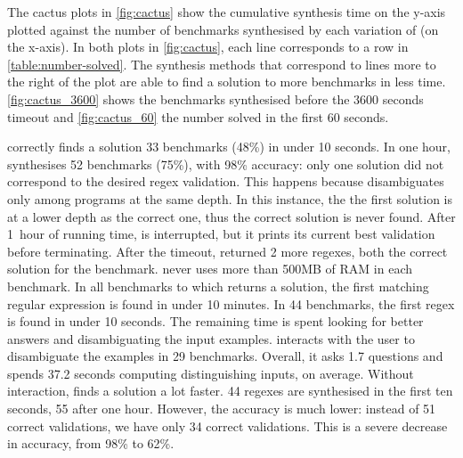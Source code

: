 

The cactus plots in \autoref{fig:cactus} show the cumulative synthesis time on the y-axis plotted against the number of benchmarks synthesised by each variation of \Forest{} (on the x-axis).
%
In both plots in \autoref{fig:cactus}, each line corresponds to a row in \autoref{table:number-solved}.
%
The synthesis methods that correspond to lines more to the right of the plot are able to find a solution to more benchmarks in less time. \autoref{fig:cactus_3600} shows the benchmarks synthesised before the 3600 seconds timeout and \autoref{fig:cactus_60} the number solved in the first 60 seconds.

\Forest correctly finds a solution 33 benchmarks (48\%) in under 10 seconds.
In one hour, \Forest{} synthesises 52 benchmarks (75\%), with 98\% accuracy: only one solution did not correspond to the desired regex validation. This happens because \Forest disambiguates only among programs at the same depth. In this instance, the the first solution is at a lower depth as the correct one, thus the correct solution is never found. 
After 1~hour of running time, \Forest{} is interrupted, but it prints its current best validation before terminating.
After the timeout, \Forest{} returned 2 more regexes, both the correct solution for the benchmark. \Forest{} never uses more than 500MB of RAM in each benchmark.
%
In all benchmarks to which \Forest returns a solution, the first matching regular expression is found in under 10 minutes. In 44 benchmarks, the first regex is found in under 10 seconds.  The remaining time is spent looking for better answers and disambiguating the input examples. 
\Forest interacts with the user to disambiguate the examples in 29 benchmarks. Overall, it asks 1.7 questions and spends 37.2 seconds computing distinguishing inputs, on average. 
%
Without interaction, \Forest finds a solution a lot faster. 44 regexes are synthesised in the first ten seconds, 55 after one hour. However, the accuracy is much lower: instead of 51 correct validations, we have only 34 correct validations. This is a severe decrease in accuracy, from 98\% to 62\%.

